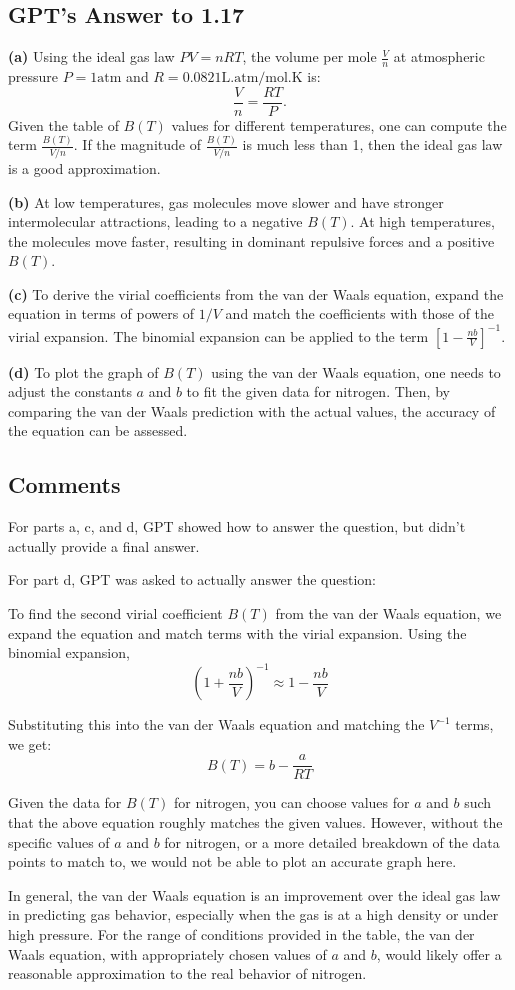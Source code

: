 \documentclass[12pt]{article}
\begin{document}
\subsection*{GPT's Answer to 1.17}

\textbf{(a)} Using the ideal gas law $PV = nRT$, the volume per mole $\frac{V}{n}$ at atmospheric pressure $P = 1 \text{atm}$ and $R = 0.0821 \text{L.atm/mol.K}$ is:
\begin{equation}
\frac{V}{n} = \frac{RT}{P}.
\end{equation}
Given the table of $B(T)$ values for different temperatures, one can compute the term $\frac{B(T)}{V/n}$. If the magnitude of $\frac{B(T)}{V/n}$ is much less than 1, then the ideal gas law is a good approximation.

\textbf{(b)} At low temperatures, gas molecules move slower and have stronger intermolecular attractions, leading to a negative $B(T)$. At high temperatures, the molecules move faster, resulting in dominant repulsive forces and a positive $B(T)$.

\textbf{(c)} To derive the virial coefficients from the van der Waals equation, expand the equation in terms of powers of $1/V$ and match the coefficients with those of the virial expansion. The binomial expansion can be applied to the term $\left[1-\frac{nb}{V}\right]^{-1}$.

\textbf{(d)} To plot the graph of $B(T)$ using the van der Waals equation, one needs to adjust the constants $a$ and $b$ to fit the given data for nitrogen. Then, by comparing the van der Waals prediction with the actual values, the accuracy of the equation can be assessed.

\subsection*{Comments}

For parts a, c, and d, GPT showed how to answer the question, but didn't actually provide a final answer.

For part d, GPT was asked to actually answer the question:

To find the second virial coefficient \(B(T)\) from the van der Waals equation, we expand the equation and match terms with the virial expansion. Using the binomial expansion,
\[
\left(1+\frac{nb}{V}\right)^{-1} \approx 1 - \frac{nb}{V}
\]

Substituting this into the van der Waals equation and matching the \(V^{-1}\) terms, we get:
\[
B(T) = b - \frac{a}{RT}
\]

Given the data for \(B(T)\) for nitrogen, you can choose values for \(a\) and \(b\) such that the above equation roughly matches the given values. However, without the specific values of \(a\) and \(b\) for nitrogen, or a more detailed breakdown of the data points to match to, we would not be able to plot an accurate graph here. 

In general, the van der Waals equation is an improvement over the ideal gas law in predicting gas behavior, especially when the gas is at a high density or under high pressure. For the range of conditions provided in the table, the van der Waals equation, with appropriately chosen values of \(a\) and \(b\), would likely offer a reasonable approximation to the real behavior of nitrogen.
\end{document}
